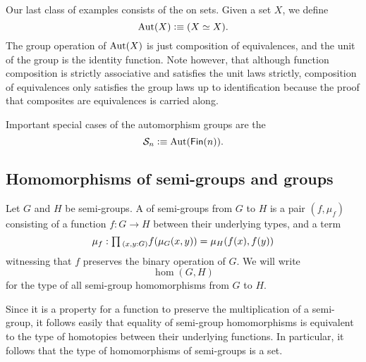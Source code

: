 \begin{eg}
  Our last class of examples consists of the  on sets. Given a set $X$, we define
  \begin{equation*}
    \operatorname{Aut}(X)\vcentcolon\equiv (X\simeq X).
  \end{equation*}
  The group operation of $\operatorname{Aut}(X)$ is just composition of equivalences, and the unit of the group is the identity function. Note however, that although function composition is strictly associative and satisfies the unit laws strictly, composition of equivalences only satisfies the group laws up to identification because the proof that composites are equivalences is carried along.

  Important special cases of the automorphism groups are the 
  \begin{equation*}
    \mathcal{S}_n\vcentcolon\equiv \operatorname{Aut}(\mathsf{Fin}(n)).
  \end{equation*}
\end{eg}

\subsection{Homomorphisms of semi-groups and groups}

\begin{defn}
  Let $G$ and $H$ be semi-groups. A  of semi-groups from $G$ to $H$ is a pair $(f,\mu_f)$ consisting of a function $f:G\to H$ between their underlying types, and a term
  \begin{equation*}
    \mu_f:\prd{x,y:G} f(\mu_G(x,y))=\mu_H(f(x),f(y))
  \end{equation*}
  witnessing that $f$ preserves the binary operation of $G$. We will write
  \begin{equation*}
    \hom(G,H)
  \end{equation*}
  for the type of all semi-group homomorphisms from $G$ to $H$.
\end{defn}

\begin{rmk}\label{rmk:is-set-hom-semi-group}
  Since it is a property for a function to preserve the multiplication of a semi-group, it follows easily that equality of semi-group homomorphisms is equivalent to the type of homotopies between their underlying functions. In particular, it follows that the type of homomorphisms of semi-groups is a set.
\end{rmk}


